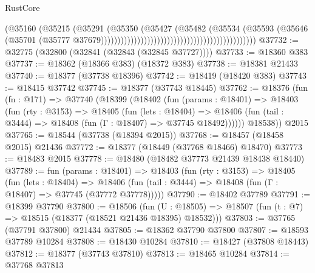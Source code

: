 \begin{lexlean}{RustCore}
\begin{coremodule}
                                                                            (@35160
                                                                              (@35215
                                                                                (@35291
                                                                                  (@35350
                                                                                    (@35427
                                                                                      (@35482
                                                                                        (@35534
                                                                                          (@35593
                                                                                            (@35646
                                                                                              (@35701
                                                                                                (@35777
                                                                                                  @37679)))))))))))))))))))))))))))))))))))))))))))))))
@37732 := @32775 (@32800 (@32841 (@32843 (@32845 @37727))))
@37733 := @18360 @383
@37737 := @18362 (@18366 @383) (@18372 @383)
@37738 := @18381 @21433
@37740 := @18377 (@37738 @18396)
@37742 := @18419 (@18420 @383)
@37743 := @18415 @37742
@37745 := @18377 (@37743 @18445)
@37762 := @18376
    (fun (fn : @171) =>
    @37740
      (@18399
        (@18402
          (fun (params : @18401) =>
          @18403
            (fun (rty : @3153) =>
            @18405
              (fun (lets : @18404) =>
              @18406 (fun (tail : @3444) => @18408 (fun (Γ : @18407) => @37745 @18492))))))
        @18538))
    @2015
@37765 := @18544 (@37738 (@18394 @2015))
@37768 := @18457 (@18458 @2015) @21436
@37772 := @18377 (@18449 (@37768 @18466) @18470)
@37773 := @18483 @2015
@37778 := @18480 (@18482 @37773 @21439 @18438 @18440)
@37789 := fun (params : @18401) =>
  @18403
    (fun (rty : @3153) =>
    @18405
      (fun (lets : @18404) =>
      @18406 (fun (tail : @3444) => @18408 (fun (Γ : @18407) => @37745 (@37772 @37778)))))
@37790 := @18402 @37789
@37791 := @18399 @37790
@37800 := @18506
    (fun (U : @18505) => @18507 (fun (t : @7) => @18515 (@18377 (@18521 @21436 @18395) @18532)))
@37803 := @37765 (@37791 @37800) @21434
@37805 := @18362 @37790 @37800
@37807 := @18593 @37789 @10284
@37808 := @18430 @10284
@37810 := @18427 (@37808 @18443)
@37812 := @18377 (@37743 @37810)
@37813 := @18465 @10284
@37814 := @37768 @37813

\end{coremodule}
\end{lexlean}
